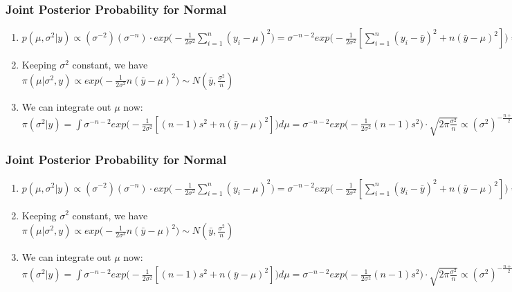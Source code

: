 \documentclass{beamer}
\begin{document}

\begin{frame}
\frametitle{Joint Posterior Probability for Normal}

\begin{enumerate}
\item $p(\mu,\sigma^2|y) \propto (\sigma^{-2}) (\sigma^{-n}) \cdot exp\Big(-\frac{1}{2\sigma^2}\sum_{i=1}^n (y_i-\mu)^2\Big) = \sigma^{-n-2}exp\Big(-\frac{1}{2\sigma^2}[\sum_{i=1}^n (y_i-\bar y)^2 + n(\bar y - \mu)^2]\Big) = \sigma^{-n-2}exp\Big(-\frac{1}{2\sigma^2}[(n-1)s^2 + n(\bar y - \mu)^2]\Big)$

\item Keeping $\sigma^2$ constant, we have $\pi(\mu|\sigma^2,y) \propto exp\Big(-\frac{1}{2\sigma^2}n(\bar y - \mu)^2\Big) \sim N(\bar y, \frac{\sigma^2}{n})$

\item We can integrate out $\mu$ now: $\pi(\sigma^2|y) = \int \sigma^{-n-2} exp\Big(-\frac{1}{2\sigma^2}[(n-1)s^2 + n(\bar y - \mu)^2]\Big) d\mu = \sigma^{-n-2} exp\Big(-\frac{1}{2\sigma^2}(n-1)s^2\Big) \cdot \sqrt{2\pi\frac{\sigma^2}{n}} \propto (\sigma^2)^{-\frac{n+1}{2}}exp\Big(-\frac{1}{2\sigma^2}(n-1)s^2\Big) $


\end{enumerate}

\end{frame}


\begin{frame}
\frametitle{Joint Posterior Probability for Normal}

\begin{enumerate}
\item $p(\mu,\sigma^2|y) \propto (\sigma^{-2}) (\sigma^{-n}) \cdot exp\Big(-\frac{1}{2\sigma^2}\sum_{i=1}^n (y_i-\mu)^2\Big) = \sigma^{-n-2}exp\Big(-\frac{1}{2\sigma^2}[\sum_{i=1}^n (y_i-\bar y)^2 + n(\bar y - \mu)^2]\Big) = \sigma^{-n-2}exp\Big(-\frac{1}{2\sigma^2}[(n-1)s^2 + n(\bar y - \mu)^2]\Big)$

\item Keeping $\sigma^2$ constant, we have $\pi(\mu|\sigma^2,y) \propto exp\Big(-\frac{1}{2\sigma^2}n(\bar y - \mu)^2\Big) \sim N(\bar y, \frac{\sigma^2}{n})$

\item We can integrate out $\mu$ now: $\pi(\sigma^2|y) = \int \sigma^{-n-2} exp\Big(-\frac{1}{2\sigma^2}[(n-1)s^2 + n(\bar y - \mu)^2]\Big) d\mu = \sigma^{-n-2} exp\Big(-\frac{1}{2\sigma^2}(n-1)s^2\Big) \cdot \sqrt{2\pi\frac{\sigma^2}{n}} \propto (\sigma^2)^{-\frac{n+1}{2}}exp\Big(-\frac{1}{2\sigma^2}(n-1)s^2\Big) $


\end{enumerate}

\end{frame}
\end{document}

